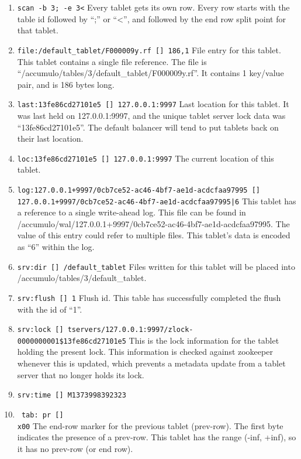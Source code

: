 \begin{enumerate}
\item{\texttt{scan -b 3; -e 3<} Every tablet gets its own row. Every row starts with the table id followed by ``;'' or ``<'', and followed by the end row split point for that tablet.}
\item{\texttt{file:/default\_tablet/F000009y.rf [] 186,1} File entry for this tablet.  This tablet contains a single file reference. The file is ``/accumulo/tables/3/default\_tablet/F000009y.rf''.  It contains 1 key/value pair, and is 186 bytes long. }
\item{\texttt{last:13fe86cd27101e5 []    127.0.0.1:9997} Last location for this tablet.  It was last held on 127.0.0.1:9997, and the unique tablet server lock data was ``13fe86cd27101e5''. The default balancer will tend to put tablets back on their last location. }
\item{\texttt{loc:13fe86cd27101e5 []    127.0.0.1:9997} The current location of this tablet.}
\item{\texttt{log:127.0.0.1+9997/0cb7ce52-ac46-4bf7-ae1d-acdcfaa97995 []    127.0.0.1+9997/0cb7ce52-ac46-4bf7-ae1d-acdcfaa97995|6} This tablet has a reference to a single write-ahead log.  This file can be found in /accumulo/wal/127.0.0.1+9997/0cb7ce52-ac46-4bf7-ae1d-acdcfaa97995.  The value of this entry could refer to multiple files.  This tablet's data is encoded as ``6'' within the log.}
\item{\texttt{srv:dir []    /default\_tablet} Files written for this tablet will be placed into /accumulo/tables/3/default\_tablet.}
\item{\texttt{srv:flush []    1} Flush id.  This table has successfully completed the flush with the id of ``1''. }
\item{\texttt{srv:lock []    tservers/127.0.0.1:9997/zlock-0000000001\$13fe86cd27101e5}  This is the lock information for the tablet holding the present lock.  This information is checked against zookeeper whenever this is updated, which prevents a metadata update from a tablet server that no longer holds its lock.}
\item{\texttt{srv:time []    M1373998392323} }
\item{\texttt{~tab:~pr []    \\x00} The end-row marker for the previous tablet (prev-row).  The first byte indicates the presence of a prev-row.  This tablet has the range (-inf, +inf), so it has no prev-row (or end row). }
\end{enumerate}

